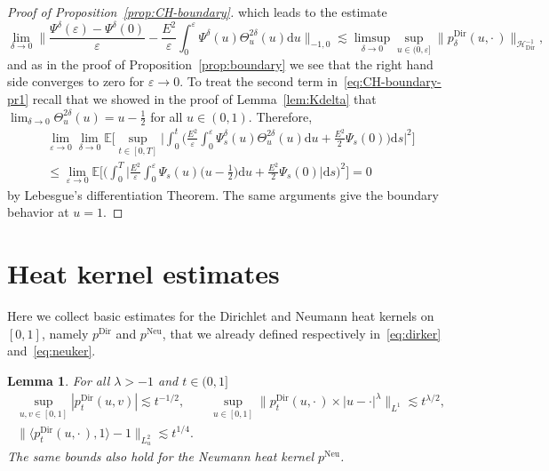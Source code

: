\documentclass[10pt]{amsart}
\newtheorem{lemm}[theo]{Lemma}\newtheorem{prop}[theo]{Proposition}\newtheorem{coro}[theo]{Corollary}\newtheorem{conj}[theo]{Conjecture}
\theoremstyle{definition}\newtheorem{defi}[theo]{Definition}\newtheorem{rema}[theo]{Remark}\newtheorem{exam}[theo]{Example}\newtheorem{exem}[theo]{Example}\newtheorem{nota}[theo]{Notation}
\DeclareMathOperator{\Dir}{Dir}
\DeclareMathOperator{\Neu}{Neu}
\newcommand{\mc}[1]{{\mathcal #1}}
\renewcommand{\mc}[1]{{\mathcal #1}}
\renewcommand{\le}{\leqslant}
\newcommand*{\dd}{\mathrm{d}}
\newcommand*{\ds}{\dd s}
\newcommand*{\du}{\dd u}
\renewcommand{\tfrac}{\frac}
\begin{document}
\begin{proof}[Proof of Proposition~\ref{prop:CH-boundary}]
which leads to the estimate
\[
\lim_{\delta \to 0} \bigg\| \frac{\Psi^\delta (\varepsilon) - \Psi^\delta(0)}{\varepsilon} - \frac{E^2}{\varepsilon} \int_0^\varepsilon \Psi^\delta(u) \Theta^{2\delta}_u(u) \du \bigg\|_{-1,0} \lesssim \limsup_{\delta \to 0} \sup_{u \in (0,\varepsilon]} \big\| p^{\Dir}_\delta(u,\cdot\,)\big\|_{\mc H_{\Dir}^{- 1}},
\]
and as in the proof of Proposition~\ref{prop:boundary} we see that the right hand side converges to zero for $\varepsilon \to 0$. To treat the second term in~\eqref{eq:CH-boundary-pr1} recall that we showed in the proof of Lemma~\ref{lem:Kdelta} that $\lim_{\delta \rightarrow 0} \Theta^{2\delta}_u (u) = u - \frac{1}{2}$ for all $u \in (0,1)$. Therefore,
\begin{multline*}
\lim_{\varepsilon \to 0} \lim_{\delta \to 0}\mathbb{E} \bigg[\sup_{t \in [0,T]} \bigg| \int_0^t \bigg(\frac{E^2}{\varepsilon} \int_0^\varepsilon \Psi^\delta_s(u) \Theta^{2\delta}_u(u) \du + \frac{E^2}{2} \Psi_s(0) \bigg) \ds \bigg|^2 \bigg] \\
\le \lim_{\varepsilon \to 0} \mathbb{E} \bigg[\bigg(\int_0^T\bigg| \frac{E^2}{\varepsilon} \int_0^\varepsilon \Psi_s(u) \big(u - \tfrac{1}{2}\big) \du + \frac{E^2}{2} \Psi_s(0)\bigg| \ds \bigg)^2 \bigg] = 0
\end{multline*}
by Lebesgue's differentiation Theorem. The same arguments give the boundary behavior at $u = 1$.
\end{proof}


\section{Heat kernel estimates}\label{app:heat-kernel}

Here we collect basic estimates for the Dirichlet and Neumann heat kernels on $[0,1]$, namely $p^{\Dir}$ and $p^{\Neu}$, that we already defined respectively in~\eqref{eq:dirker} and~\eqref{eq:neuker}.

\begin{lemm}\label{lem:Dirichlet-heat-kernel}
For all $\lambda > - 1$ and $t \in (0, 1]$
\begin{gather*}
\sup_{u, v \in [0, 1]} | p^{\Dir}_t (u, v) | \lesssim t^{- 1 / 2}, \qquad
\sup_{u \in [0, 1]} \big\| p^{\Dir}_t (u, \cdot\,)\times | u - \cdot |^{\lambda}
\big\|_{L^1} \lesssim t^{\lambda / 2}, \\
\big\| \langle p_t^{\Dir} (u, \cdot\,), 1 \rangle - 1 \big\|_{L^2_u} \lesssim t^{1 / 4}.
\end{gather*}
The same bounds also hold for the Neumann heat kernel $p^{\Neu}$.
\end{lemm}
\end{document}
